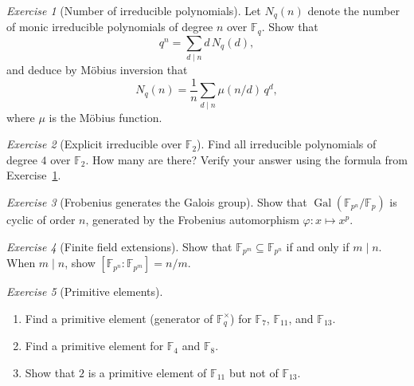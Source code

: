 \documentclass[12pt,a4paper,openany]{book}
\theoremstyle{definition}
\theoremstyle{remark}
\newtheorem{exercise}{Exercise}[chapter]
\newcommand{\F}{\mathbb{F}}
\DeclareMathOperator{\Gal}{Gal}
\begin{document}
\begin{exercise}[Number of irreducible polynomials]
\label{exer:number-irred-polys}
Let $N_q(n)$ denote the number of monic irreducible polynomials of
degree $n$ over $\F_q$. Show that
\[
  q^n = \sum_{d \mid n} d\, N_q(d),
\]
and deduce by M\"obius inversion that
\[
  N_q(n) = \frac{1}{n} \sum_{d \mid n} \mu(n/d)\, q^d,
\]
where $\mu$ is the M\"obius function.
\end{exercise}

\begin{exercise}[Explicit irreducible over $\F_2$]
\label{exer:explicit-irred-F2}
Find all irreducible polynomials of degree $4$ over $\F_2$. How many
are there? Verify your answer using the formula from
Exercise~\ref{exer:number-irred-polys}.
\end{exercise}

\begin{exercise}[Frobenius generates the Galois group]
\label{exer:frobenius-galois}
Show that $\Gal(\F_{p^n}/\F_p)$ is cyclic of order $n$, generated
by the Frobenius automorphism $\varphi \colon x \mapsto x^p$.
\end{exercise}

\begin{exercise}[Finite field extensions]
\label{exer:ff-extensions}
Show that $\F_{p^m} \subseteq \F_{p^n}$ if and only if $m \mid n$.
When $m \mid n$, show $[\F_{p^n}:\F_{p^m}] = n/m$.
\end{exercise}

\begin{exercise}[Primitive elements]
\label{exer:primitive-elements}
\begin{enumerate}[label=(\alph*)]
  \item Find a primitive element (generator of $\F_q^{\times}$) for
    $\F_7$, $\F_{11}$, and $\F_{13}$.
  \item Find a primitive element for $\F_4$ and $\F_8$.
  \item Show that $2$ is a primitive element of $\F_{11}$ but not of
    $\F_{13}$.
\end{enumerate}
\end{exercise}
\end{document}
